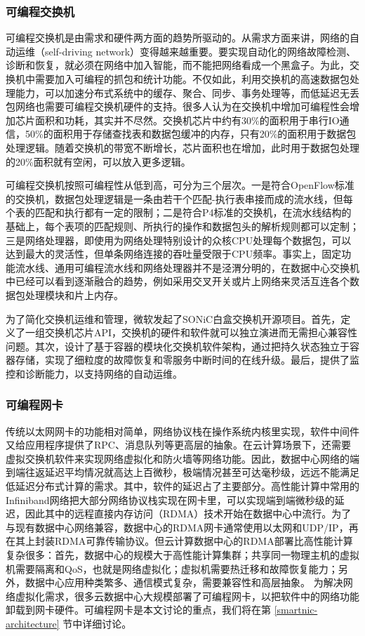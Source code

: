 \subsubsection{可编程交换机}

可编程交换机是由需求和硬件两方面的趋势所驱动的。从需求方面来讲，网络的自动运维（self-driving network）变得越来越重要。要实现自动化的网络故障检测、诊断和恢复，就必须在网络中加入智能，而不能把网络看成一个黑盒子。为此，交换机中需要加入可编程的抓包和统计功能。不仅如此，利用交换机的高速数据包处理能力，可以加速分布式系统中的缓存、聚合、同步、事务处理等，而低延迟无丢包网络也需要可编程交换机硬件的支持。很多人认为在交换机中增加可编程性会增加芯片面积和功耗，其实并不尽然。交换机芯片中约有30\%的面积用于串行IO通信，50\%的面积用于存储查找表和数据包缓冲的内存，只有20\%的面积用于数据包处理逻辑。随着交换机的带宽不断增长，芯片面积也在增加，此时用于数据包处理的20\%面积就有空闲，可以放入更多逻辑。

可编程交换机按照可编程性从低到高，可分为三个层次。一是符合OpenFlow标准的交换机，数据包处理逻辑是一条由若干个匹配-执行表串接而成的流水线，但每个表的匹配和执行都有一定的限制；二是符合P4标准的交换机，在流水线结构的基础上，每个表项的匹配规则、所执行的操作和数据包头的解析规则都可以定制；三是网络处理器，即使用为网络处理特别设计的众核CPU处理每个数据包，可以达到最大的灵活性，但单条网络连接的吞吐量受限于CPU频率。事实上，固定功能流水线、通用可编程流水线和网络处理器并不是泾渭分明的，在数据中心交换机中已经可以看到逐渐融合的趋势，例如采用交叉开关或片上网络来灵活互连各个数据包处理模块和片上内存。

为了简化交换机运维和管理，微软发起了SONiC白盒交换机开源项目。首先，定义了一组交换机芯片API，交换机的硬件和软件就可以独立演进而无需担心兼容性问题。其次，设计了基于容器的模块化交换机软件架构，通过把持久状态独立于容器存储，实现了细粒度的故障恢复和零服务中断时间的在线升级。最后，提供了监控和诊断能力，以支持网络的自动运维。

\subsubsection{可编程网卡}

传统以太网网卡的功能相对简单，网络协议栈在操作系统内核里实现，软件中间件又给应用程序提供了RPC、消息队列等更高层的抽象。在云计算场景下，还需要虚拟交换机软件来实现网络虚拟化和防火墙等网络功能。因此，数据中心网络的端到端往返延迟平均情况就高达上百微秒，极端情况甚至可达毫秒级，远远不能满足低延迟分布式计算的需求。其中，软件的延迟占了主要部分。高性能计算中常用的Infiniband网络把大部分网络协议栈实现在网卡里，可以实现端到端微秒级的延迟，因此其中的远程直接内存访问（RDMA）技术开始在数据中心中流行。为了与现有数据中心网络兼容，数据中心的RDMA网卡通常使用以太网和UDP/IP，再在其上封装RDMA可靠传输协议。但云计算数据中心的RDMA部署比高性能计算复杂很多：首先，数据中心的规模大于高性能计算集群；共享同一物理主机的虚拟机需要隔离和QoS，也就是网络虚拟化；虚拟机需要热迁移和故障恢复能力；另外，数据中心应用种类繁多、通信模式复杂，需要兼容性和高层抽象。
为解决网络虚拟化需求，很多云数据中心大规模部署了可编程网卡，以把软件中的网络功能卸载到网卡硬件。可编程网卡是本文讨论的重点，我们将在第 \ref{smartnic-architecture} 节中详细讨论。

